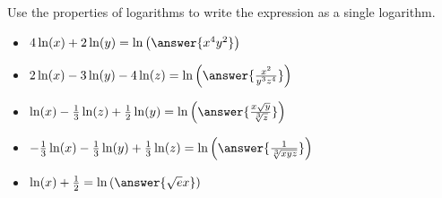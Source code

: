 \documentclass{ximera}
\author{Carl Stitz \and Jeff Zeager \and Bart Snapp \and Matthew Carr}
\begin{document}
\begin{exercise}
Use the properties of logarithms to write the expression as a single
logarithm. 

\begin{itemize}
\item $4\ln(x) + 2\ln(y)=\ln\left(\answer{x^4y^2}\right)$ 
\item $2 \ln(x) -3 \ln(y) - 4\ln(z)=\ln\left(\answer{\frac{x^2}{y^3z^4}}\right)$
\item $\ln(x) - \frac{1}{3} \ln(z) + \frac{1}{2} \ln(y)=\ln\left(\answer{\frac{x\sqrt{y}}{\sqrt[3]{z}}}\right)$
\item $-\frac{1}{3} \ln(x) - \frac{1}{3}\ln(y) + \frac{1}{3} \ln(z)=\ln\left(\answer{\frac{1}{\sqrt[3]{xyz}}}\right)$
\item $\ln(x) + \frac{1}{2}=\ln\left(\answer{\sqrt{e}x}\right)$  
\end{itemize}

\end{exercise}
\end{document}
